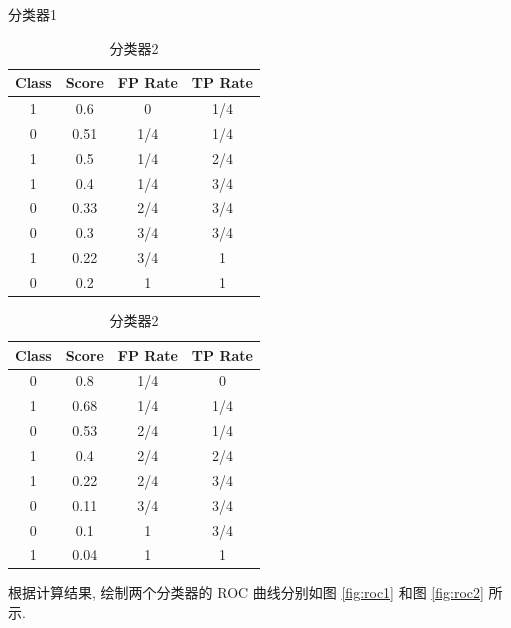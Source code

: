 \documentclass[openany]{ctexbook}
\theoremstyle{kaiti}
\theoremstyle{normal}
\begin{document}
\begin{table}
  \centering
  \begin{minipage}{0.49\textwidth}
    \centering
    \caption{分类器1}
    \label{tab:classifier1}
    \begin{tabular}{cccc}
      \toprule
      Class & Score & FP Rate & TP Rate \\
      \midrule
      1     & 0.6   & 0       & 1/4     \\
      0     & 0.51  & 1/4     & 1/4     \\
      1     & 0.5   & 1/4     & 2/4     \\
      1     & 0.4   & 1/4     & 3/4     \\
      0     & 0.33  & 2/4     & 3/4     \\
      0     & 0.3   & 3/4     & 3/4     \\
      1     & 0.22  & 3/4     & 1       \\
      0     & 0.2   & 1       & 1       \\
      \bottomrule   
    \end{tabular}
  \end{minipage}
  \begin{minipage}{0.49\textwidth}
    \centering
    \caption{分类器2}
    \label{tab:classifier2}
    \begin{tabular}{cccc}
      \toprule
      Class & Score & FP Rate & TP Rate \\
      \midrule
      0     & 0.8   & 1/4     & 0       \\
      1     & 0.68  & 1/4     & 1/4     \\
      0     & 0.53  & 2/4     & 1/4     \\
      1     & 0.4   & 2/4     & 2/4     \\
      1     & 0.22  & 2/4     & 3/4     \\
      0     & 0.11  & 3/4     & 3/4     \\
      0     & 0.1   & 1       & 3/4     \\
      1     & 0.04  & 1       & 1       \\
      \bottomrule   
    \end{tabular}
  \end{minipage}
\end{table}

根据计算结果, 绘制两个分类器的 ROC 曲线分别如图 \ref{fig:roc1} 和图 \ref{fig:roc2} 所示.
\end{document}
